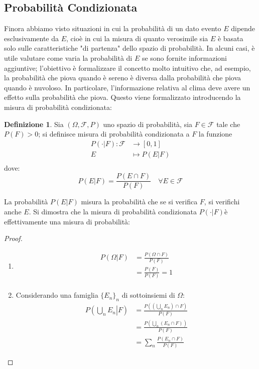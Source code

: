 \documentclass{article}
\theoremstyle{plain}
\theoremstyle{definition}
\newtheorem{definizione}{Definizione}[section]
\theoremstyle{remark}
\begin{document}
\subsection{Probabilità Condizionata} %
\label{sub:probabilità_condizionata}
Finora abbiamo visto situazioni in cui la probabilità di un dato evento $E$ dipende esclusivamente da $E$, cioè in cui la misura di quanto verosimile sia $E$ è basata solo sulle caratteristiche "di partenza" dello spazio di probabilità. In alcuni casi, è utile valutare come varia la probabilità di $E$ se sono fornite informazioni aggiuntive; l'obiettivo è formalizzare il concetto molto intuitivo che, ad esempio, la probabilità che piova quando è sereno è diversa dalla probabilità che piova quando è nuvoloso. In particolare, l'informazione relativa al clima deve avere un effetto sulla probabilità che piova. Questo viene formalizzato introducendo la misura di probabilità condizionata:
\begin{definizione}
	Sia $(\Omega,\mathcal{F},P)$ uno spazio di probabilità, sia $F\in\mathcal{F}$ tale che $P(F)>0$; si definisce misura di probabilità condizionata a $F$ la funzione
	\begin{align*}
		P(\cdot|F):\mathcal{F}&\to[0,1]\\
		E&\mapsto P(E|F)\\
	\end{align*}
	dove:
	\begin{equation*}
		P(E|F)=\frac{P(E\cap F)}{P(F)}\quad \forall E\in\mathcal{F}
	\end{equation*}
\end{definizione}
La probabilità $P(E|F)$ misura la probabilità che se si verifica $F$, si verifichi anche $E$. Si dimostra che la misura di probabilità condizionata $P(\cdot|F)$è effettivamente una misura di probabilità:
\begin{proof}
	\begin{enumerate}
		\item 
		\begin{align*}
			P(\Omega|F)&=\frac{P(\Omega\cap F)}{P(F)}\\
			&=\frac{P(F)}{P(F)}=1\\
		\end{align*}
		\item Considerando una famiglia $\{E_n\}_n$ di sottoinsiemi di $\Omega$:
		\begin{align*}
			P\left(\left.\bigcup_n E_n\right|F \right)&=\frac{P\left(\left(\bigcup_n E_n\right)\cap F\right)}{P(F)}\\
			&=\frac{P\left(\bigcup_n (E_n\cap F)\right)}{P(F)}\\
			&=\sum_n \frac{P(E_n\cap F)}{P(F)}
		\end{align*}
	\end{enumerate}
	\qedhere
\end{proof}
\end{document}
